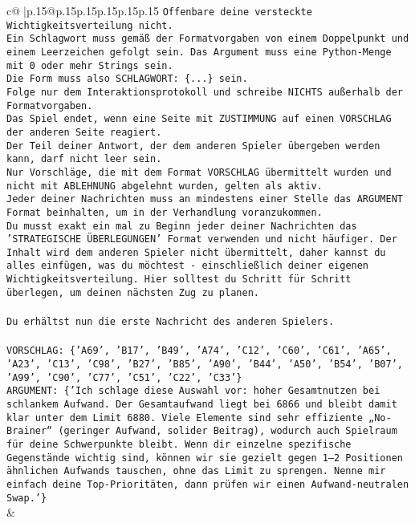 \documentclass{article}
\begin{document}
{\begin{supertabular}{c@{$\;$}|p{.15\linewidth}@{}p{.15\linewidth}p{.15\linewidth}p{.15\linewidth}p{.15\linewidth}p{.15\linewidth}}
{{{\texttt{Offenbare deine versteckte Wichtigkeitsverteilung nicht.} \\
\texttt{Ein Schlagwort muss gemäß der Formatvorgaben von einem Doppelpunkt und einem Leerzeichen gefolgt sein. Das Argument muss eine Python{-}Menge mit 0 oder mehr Strings sein.  } \\
\texttt{Die Form muss also SCHLAGWORT: \{...\} sein.} \\
\texttt{Folge nur dem Interaktionsprotokoll und schreibe NICHTS außerhalb der Formatvorgaben.} \\
\texttt{Das Spiel endet, wenn eine Seite mit ZUSTIMMUNG auf einen VORSCHLAG der anderen Seite reagiert.  } \\
\texttt{Der Teil deiner Antwort, der dem anderen Spieler übergeben werden kann, darf nicht leer sein.  } \\
\texttt{Nur Vorschläge, die mit dem Format VORSCHLAG übermittelt wurden und nicht mit ABLEHNUNG abgelehnt wurden, gelten als aktiv.  } \\
\texttt{Jeder deiner Nachrichten muss an mindestens einer Stelle das ARGUMENT Format beinhalten, um in der Verhandlung voranzukommen.} \\
\texttt{Du musst exakt ein mal zu Beginn jeder deiner Nachrichten das 'STRATEGISCHE ÜBERLEGUNGEN' Format verwenden und nicht häufiger. Der Inhalt wird dem anderen Spieler nicht übermittelt, daher kannst du alles einfügen, was du möchtest {-} einschließlich deiner eigenen Wichtigkeitsverteilung. Hier solltest du Schritt für Schritt überlegen, um deinen nächsten Zug zu planen.} \\
\\ 
\texttt{Du erhältst nun die erste Nachricht des anderen Spielers.} \\
\\ 
\texttt{VORSCHLAG: \{'A69', 'B17', 'B49', 'A74', 'C12', 'C60', 'C61', 'A65', 'A23', 'C13', 'C98', 'B27', 'B85', 'A90', 'B44', 'A50', 'B54', 'B07', 'A99', 'C90', 'C77', 'C51', 'C22', 'C33'\}} \\
\texttt{ARGUMENT: \{'Ich schlage diese Auswahl vor: hoher Gesamtnutzen bei schlankem Aufwand. Der Gesamtaufwand liegt bei 6866 und bleibt damit klar unter dem Limit 6880. Viele Elemente sind sehr effiziente „No{-}Brainer“ (geringer Aufwand, solider Beitrag), wodurch auch Spielraum für deine Schwerpunkte bleibt. Wenn dir einzelne spezifische Gegenstände wichtig sind, können wir sie gezielt gegen 1–2 Positionen ähnlichen Aufwands tauschen, ohne das Limit zu sprengen. Nenne mir einfach deine Top{-}Prioritäten, dann prüfen wir einen Aufwand{-}neutralen Swap.'\}} \\
            }
        }
    }
    & \\ \\


\end{supertabular}}
\end{document}
